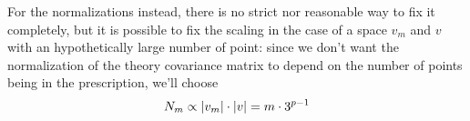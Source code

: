 For the normalizations instead, there is no strict nor reasonable way to fix it
completely, but it is possible to fix the scaling in the case of a space
$v_m$ and $v$ with an hypothetically large number of point: since we don't want
the normalization of the theory covariance matrix to depend on the number of
points being in the prescription, we'll choose
\begin{equation}
    \label{eq:N-norm}
    N_m \propto \abs{v_m} \cdot \abs{v} = m \cdot 3^{p-1}
\end{equation}
